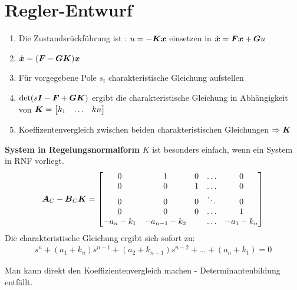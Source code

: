 \section{Regler-Entwurf}
\begin{tcolorbox}[colback=white!10!white,colframe=green!30!black] 

	\begin{enumerate}
		\item 	Die Zustandsrückführung ist : $u = -\boldsymbol{Kx}$ einsetzen in $\dot{\boldsymbol{x}} = \boldsymbol{Fx}+\boldsymbol{G}u$
		\item $\dot{\boldsymbol{x}} = (\boldsymbol{F}-\boldsymbol{GK})\boldsymbol{x}$
		\item Für vorgegebene Pole $s_i$ charakteristische Gleichung aufstellen
		\item $\det (s\boldsymbol{I}-\boldsymbol{F}+\boldsymbol{GK})$ ergibt die charakteristische Gleichung in Abhängigkeit von $\boldsymbol{K} = \begin{bmatrix}
		k_1 & \ldots & kn
		\end{bmatrix}$
		\item Koeffizentenvergleich zwischen beiden charakteristischen Gleichungen $\Rightarrow \boldsymbol{K}$ 
	\end{enumerate} 
\tcblower
\textbf{System in Regelungsnormalform}
$K$ ist besonders einfach, wenn ein System in RNF vorliegt.
\begin{align*}
	\boldsymbol{A}_C-\boldsymbol{B}_C\boldsymbol{K} = \begin{bmatrix}
	0 & 1& 0&\ldots&0\\ 	0 & 0& 1&\ldots&0\\
	0 & 0& 0&\ddots&0\\
	0 & 0& 0&\ldots&1\\
	-a_n-k_1 & -a_{n-1}-k_2& &\ldots&-a_{1}-k_n\\
	\end{bmatrix}
\end{align*}
Die charakteristische Gleichung ergibt sich sofort zu:
\begin{align*}
	s^n +(a_1+k_n)s^{n-1}+(a_2+k_{n-1})s^{n-2}+\ldots+(a_n+k_1) =0 
\end{align*}

Man kann direkt den Koeffizientenvergleich machen - Determinantenbildung entfällt.
	
\end{tcolorbox}

